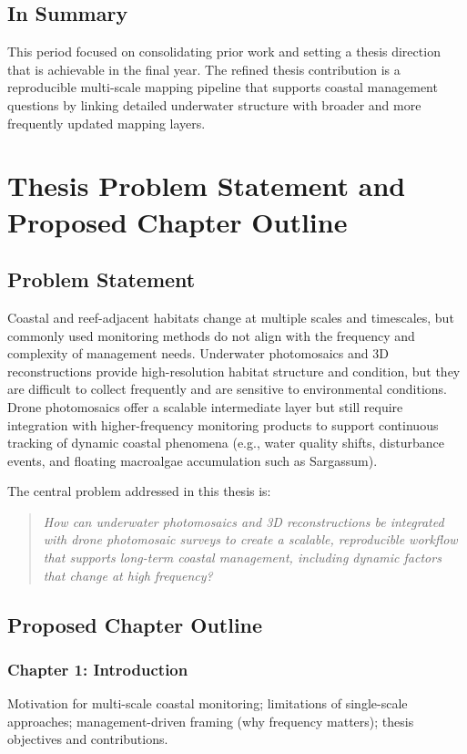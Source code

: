 \documentclass[a4paper,12pt]{article}
\begin{document}
\subsection{In Summary}
This period focused on consolidating prior work and setting a thesis direction that is achievable in the final year. The refined thesis contribution is a reproducible multi-scale mapping pipeline that supports coastal management questions by linking detailed underwater structure with broader and more frequently updated mapping layers.
\newpage


\section{Thesis Problem Statement and Proposed Chapter Outline}

\subsection{Problem Statement}
Coastal and reef-adjacent habitats change at multiple scales and timescales, but commonly used monitoring methods do not align with the frequency and complexity of management needs. Underwater photomosaics and 3D reconstructions provide high-resolution habitat structure and condition, but they are difficult to collect frequently and are sensitive to environmental conditions. Drone photomosaics offer a scalable intermediate layer but still require integration with higher-frequency monitoring products to support continuous tracking of dynamic coastal phenomena (e.g., water quality shifts, disturbance events, and floating macroalgae accumulation such as Sargassum).

The central problem addressed in this thesis is:

\begin{quote}
\textit{How can underwater photomosaics and 3D reconstructions be integrated with drone photomosaic surveys to create a scalable, reproducible workflow that supports long-term coastal management, including dynamic factors that change at high frequency?}
\end{quote}

\subsection{Proposed Chapter Outline}

\subsubsection*{Chapter 1: Introduction}
Motivation for multi-scale coastal monitoring; limitations of single-scale approaches; management-driven framing (why frequency matters); thesis objectives and contributions.
\end{document}
